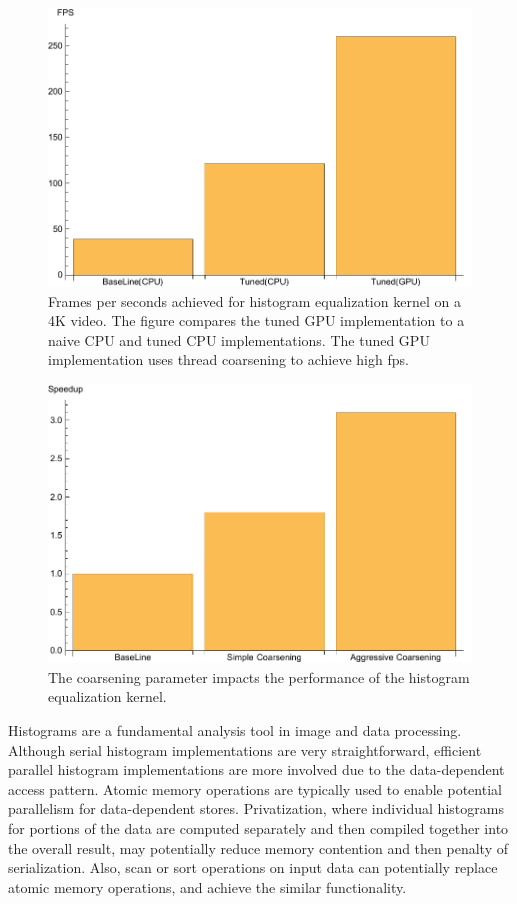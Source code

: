 \begin{figure}
\centering
\includegraphics[scale=0.5]{data/histogram.pdf}
\caption{Frames per seconds achieved for histogram equalization kernel on a 4K video. The figure compares the tuned GPU implementation to a naive CPU and tuned CPU implementations. The tuned GPU implementation uses thread coarsening to achieve high fps.}
\label{fig:histogram}
\centering
\end{figure}


\begin{figure}
\centering
\includegraphics[scale=0.5]{data/histogramc.pdf}
\caption{The coarsening parameter impacts the performance of the histogram equalization kernel.}
\label{fig:histogramCoarsining}
\centering
\end{figure}

Histograms are a fundamental analysis tool in image and data processing.
Although serial  histogram implementations are very straightforward, efficient parallel histogram implementations are
more involved due to the data-dependent access pattern. 
Atomic memory operations are typically used to enable potential parallelism for data-dependent stores. 
Privatization, where individual histograms for portions of the data are computed separately
and then compiled together into the overall result, may potentially reduce memory contention and then penalty of serialization.
Also, scan or sort operations on input data can potentially replace atomic memory operations, and achieve the similar functionality.

